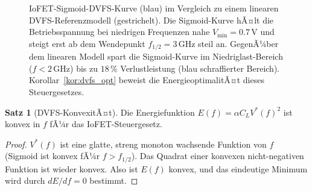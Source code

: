 ﻿\documentclass[a4paper,12pt]{scrreprt}
\theoremstyle{definition}
\newtheorem{satz}{Satz}[chapter]
\begin{document}
	\begin{figure}[H]
		\centering
		\caption{IoFET-Sigmoid-DVFS-Kurve (blau) im Vergleich zu einem linearen
			DVFS-Referenzmodell (gestrichelt). Die Sigmoid-Kurve hÃ¤lt die
			Betriebsspannung bei niedrigen Frequenzen nahe $V_{\min} = 0.7\,\text{V}$
			und steigt erst ab dem Wendepunkt $f_{1/2} = 3\,\text{GHz}$ steil an.
			GegenÃ¼ber dem linearen Modell spart die Sigmoid-Kurve im Niedriglast-Bereich
			($f < 2\,\text{GHz}$) bis zu $18\,\%$ Verlustleistung (blau schraffierter
			Bereich). Korollar~\ref{kor:dvfs_opt} beweist die EnergieoptimalitÃ¤t dieses
			Steuergesetzes.}
		\label{fig:dvfs-sigmoid}
	\end{figure}

	\begin{satz}[DVFS-KonvexitÃ¤t]\label{satz:dvfs_convex}
		Die Energiefunktion $E(f) = \alpha C_L V^*(f)^2$ ist konvex in $f$
		fÃ¼r das IoFET-Steuergesetz.
	\end{satz}

	\begin{proof}
		$V^*(f)$ ist eine glatte, streng monoton wachsende Funktion von $f$
		(Sigmoid ist konvex fÃ¼r $f > f_{1/2}$). Das Quadrat einer konvexen
		nicht-negativen Funktion ist wieder konvex. Also ist $E(f)$ konvex,
		und das eindeutige Minimum wird durch $dE/df = 0$ bestimmt.
	\end{proof}
\end{document}
